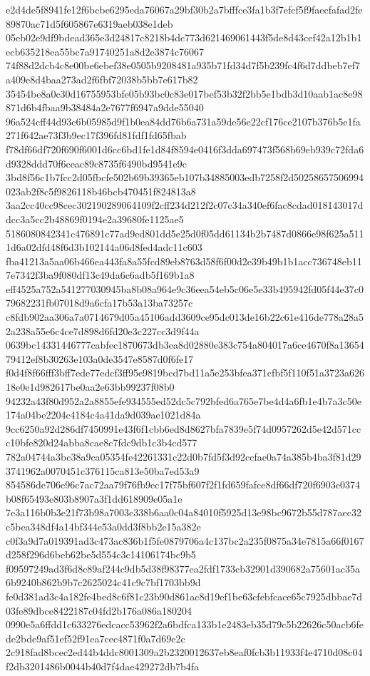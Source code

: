 \documentclass[11pt,a4paper]{article}
\begin{document}
{e2d4de5f8941fe12f6bcbe6295eda76067a29bf30b2a7bfffce3fa1b3f7efcf5f9faecfafad2fe89870ac71d5f605867e6319aeb038e1deb
05eb02e9df9bdead365e3d24817c8218b4dc773d621469061443f5de8d43cef42a12b1b1ecb635218ea55bc7a91740251a8d2e3874c76067
74f88d2dcb4c8e00be6ebef38e0505b9208481a935b71fd34d7f5b239fc4f6d7ddbeb7ef7a409e8d4baa273ad2f6fbf72038b5bb7e617b82
35454be8a0c30d16755953bfe05b93bc0c83e017bef53b32f2bb5e1bdb3d10aab1ac8e98871d6b4fbaa9b38484a2e7677f6947a9dde55040
96a524cff44d93c6b05985d9f1b0ea84dd76b6a731a59de56e22cf176ce2107b376b5e1fa271f642ae73f3b9ec17f396fd81fdf1fd65fbab
f78df66df720f690f6001d6cc6bd1fe1d84f8594e0416f3dda697473f568b69eb939c72fda6d9328ddd70f6ceac89c8735f6490bd9541e9c
3bd8f56c1b7fcc2d05fbcfe502b69b39365eb107b34885003edb7258f2d50258657506994023ab2f8c5f9826118b46bcb470451f824813a8
3aa2cc40cc98cec302190289064109f2cff234d212f2c07c34a340ef6fac8cdad018143017ddcc3a5cc2b48869f0194e2a39680fe1125ae5
5186080842341c476891c77ad9ed801dd5e25d0f05dd61134b2b7487d0866e98f625a5111d6a02dfd48f6d3b102144a06d8fed4adc11c603
fba41213a5aa06b466ea443fa8a55fcd89eb8763d58f6f00d2e39b49b1b1acc736748eb117e7342f3ba9f080df13c49da6c6adb5f169b1a8
eff4525a752a541277030945ba8b08a964e9c36eea54eb5c06e5e33b495942fd05f44e37c079682231fb07018d9a6cfa17b53a13ba73257c
c8fdb902aa306a7a0714679d05a45106add3609ce95dc013de16b22c61e416de778a28a52a238a55e6c4ce7d898d6fd20e3c227cc3d9f44a
0639bc14331446777cabfec1870673db3ea8d02880e383c754a804017a6ce4670f8a1365479412ef8b30263e103a0de3547e8587d0f6fe17
f0d4f8f66fff3bff7ede77edcf3ff95e9819bcd7bd11a5e253bfea371cfbf5f110f51a3723a62618e0e1d982617be0aa2e63bb99237f08b0
94232a43f80d952a2a8855efe934555ed52dc5c792bfed6a765e7be4d4a6fb1e4b7a3c50e174a04be2204c4184c4a41da9d039ae1021d84a
9cc6250a92d286df7450991e43f6f1cbb6ed8d8627bfa7839e5f74d0957262d5e42d571ccc10bfe820d24abba8cae8c7fdc9db1c3b4cd577
782a04744a3bc38a9ca05354fe42261331c22d0b7fd5f3d92ccfae0a74a385b4ba3f81d293741962a0070451c376115ca813e50ba7ed53a9
854586de706e96c7ac72aa79f76fb9ec17f75bf607f2f1fd659fafce8df66df720f6903e0374b08f65493e803b8907a3f1dd618909e05a1e
7e3a116b0b3e21f73b98a7003c338b6aa0c04a84010f5925d13e98bc9672b55d787aec32c5bea348df4a14bf344e53a0dd3f8bb2e15a382e
c0f3a9d7a019391ad3c473ac836b1f5fe0879706a4c137bc2a235f0875a34e7815a66f0167d258f296d6beb62be5d554c3c14106174bc9b5
f09597249ad3f6d8c89af244c9db5d38f98377ea2fdf1733cb32901d390682a75601ac35a6b9240b862b9b7c2625024c41c9c7bf1703bb9d
fe0d381ad3c4a182fe4bed8c6f81c23b90d861ac8d19ef1be63cfebfcace65c7925dbbae7d03fe89dbce8422187c04fd2b176a086a180204
0990e5a6ffdd1c633276edcacc53962f2a6bdfca133b1e2483eb35d79c5b22626c50acb6fede2bde9af51ef52f91ea7cec4871f0a7d69e2c
2c918fad8bcec2ed44b4ddc8001309a2b2320012637eb8eaf0fcb3b11933f4e4710d08c04f2db3201486b0044b40d7f4dae429272db7b4fa
}
\end{document}
